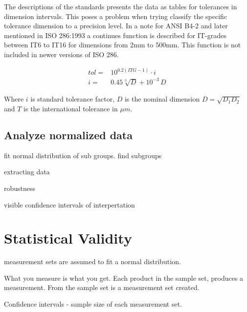 \documentclass[aip,amsmath, reprint, author-year]{revtex4-1}
\begin{document}
The descriptions of the standards presents the data as tables for tolerances in dimension intervals. This poses a problem when trying classify the specific tolerance dimension to a precision level.
In a note for ANSI B4-2  and later mentioned in ISO 286:1993 a continues function is described for IT-grades between IT6 to IT16 for dimensions from 2mm to 500mm. This function is not included in newer versions of ISO 286.

\begin{align}
	tol =& 10^{0.2 (ITG -1)} \cdot i \\
	i =& 0.45 \sqrt[3]{D} + 10^{-3} \, D 
\end{align}

Where $i$ is standard tolerance factor, $D$ is the nominal dimension $D = \sqrt{D_1 D_2}$ and $T$ is the international tolerance in $\mu m$.

\subsection{Analyze normalized data}

fit normal distribution of sub groups.
find subgroups

extracting data

robustness 



visible confidence intervals of interpertation


\section{Statistical Validity}

measurement sets are assumed to fit a normal distribution.

What you measure is what you get.
Each product in the sample set, produces a measurement. From the sample set is a  measurement set created. 

Confidence intervals - sample size of each measurement set.
\end{document}
